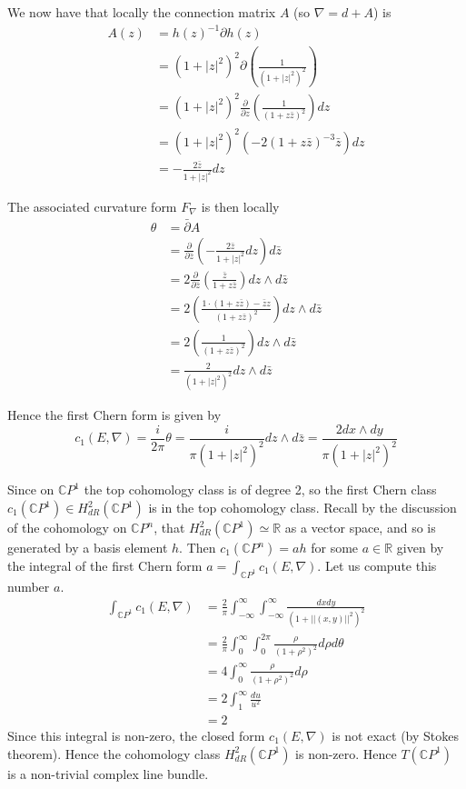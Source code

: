 \documentclass[a4paper]{article}
\theoremstyle{definition} \newtheorem*{definition}{Definition}
\theoremstyle{definition} \newtheorem*{definitions}{Definitions}
\theoremstyle{plain} \newtheorem{theorem}{Theorem}[section]
\theoremstyle{plain} \newtheorem{proposition}[theorem]{Proposition}
\theoremstyle{plain} \newtheorem{corollary}[theorem]{Corollary}
\theoremstyle{plain} \newtheorem{lemma}[theorem]{Lemma}
\theoremstyle{plain} \newtheorem{example}[theorem]{Example}
\newcommand{\realnos}{\mathbb{R}}
\newcommand{\complexnos}{\mathbb{C}}
\begin{document}
We now have that locally the connection matrix $A$ (so $\nabla=d+A$) is 
\begin{align*}
A(z) & =h(z)^{-1}\partial h(z) \\
& = (1+|z|^2)^2 \partial \left( \frac{1}{(1+|z|^2)^2} \right) \\
& = (1+|z|^2)^2 \frac{\partial}{\partial z} \left( \frac{1}{(1+z\bar{z})^2} \right)dz \\
& = (1+|z|^2)^2 \left( -2 (1+z\bar{z})^{-3} \bar{z} \right)dz \\
& = -\frac{2\bar{z}}{1+|z|^2} dz
\end{align*}

The associated curvature form $F_\nabla$ is then locally
\begin{align*}
\theta & = \bar{\partial} A \\
& = \frac{\partial}{\partial \bar{z}} \left( -\frac{2\bar{z}}{1+|z|^2} dz \right) d\bar{z} \\
& = 2 \frac{\partial}{\partial \bar{z}} \left(\frac{\bar{z}}{1+z\bar{z}} \right) dz\wedge d\bar{z} \\
& = 2 \left(\frac{1\cdot (1+z\bar{z})-\bar{z}z}{(1+z\bar{z})^2} \right) dz\wedge d\bar{z} \\
& = 2 \left(\frac{1}{(1+z\bar{z})^2} \right) dz\wedge d\bar{z} \\
& = \frac{2}{(1+|z|^2)^2} dz \wedge d\bar{z}
\end{align*}


Hence the first Chern form is given by 
$$c_1(E, \nabla) = \frac{i}{2\pi} \theta = \frac{i}{\pi(1+|z|^2)^2} dz \wedge d\bar{z} = \frac{2dx\wedge dy}{\pi(1+|z|^2)^2}$$

Since on $\complexnos P^1$ the top cohomology class is of degree 2, so the first Chern class $c_1(\complexnos P^1)\in H^2_{dR}(\complexnos P^1)$ is in the top cohomology class. Recall by the discussion of the cohomology on $\complexnos P^n$, that $H^2_{dR}(\complexnos P^1)\simeq \realnos$ as a vector space, and so is generated by a basis element $h$. Then $c_1(\complexnos P^n) = ah$ for some $a\in \realnos$ given by the integral of the first Chern form $a=\int_{\complexnos P^1} c_1(E, \nabla)$. Let us compute this number $a$.
\begin{align*}
    \int_{\complexnos P^1} c_1(E, \nabla) & =  \frac{2}{\pi} \int_{-\infty}^\infty \int_{-\infty}^\infty \frac{dx dy}{(1+||(x,y)||^2)^2} \\
    & = \frac{2}{\pi} \int_{0}^\infty \int_{0}^{2\pi} \frac{\rho}{(1+\rho^2)^2} d\rho d\theta \\
    & = 4 \int_{0}^\infty \frac{\rho}{(1+\rho^2)^2} d\rho  \\
    & = 2 \int_{1}^\infty \frac{du}{u^2}  \\
    & = 2
\end{align*}
Since this integral is non-zero, the closed form $c_1(E,\nabla)$ is not exact (by Stokes theorem). Hence the cohomology class $H^2_{dR}(\complexnos P^1)$ is non-zero. Hence $T(\complexnos P^1)$ is a non-trivial complex line bundle. 
\end{document}

